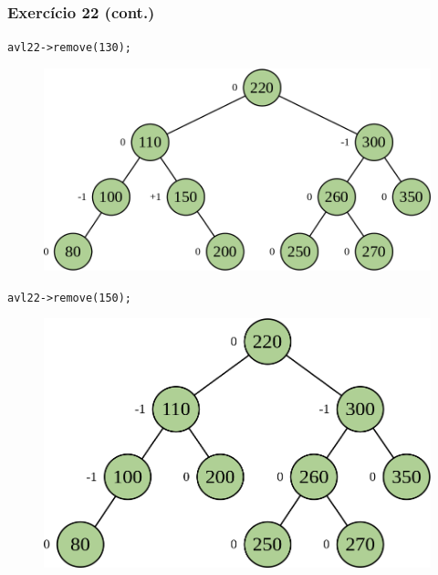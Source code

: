 \documentclass[aspectratio=169]{beamer}
\begin{document}
\begin{frame}[fragile]\frametitle{Exercício 22 (cont.)}
\texttt{avl22->remove(130);}
\begin{figure}[h]
	\centering
	\includegraphics[height=0.25\paperheight]{imagens/avl-exercicio22e.png}
\end{figure}
\texttt{avl22->remove(150);}
\begin{figure}[h]
	\centering
	\includegraphics[height=0.25\paperheight]{imagens/avl-exercicio22f.png}
\end{figure}
\end{frame}
\end{document}
